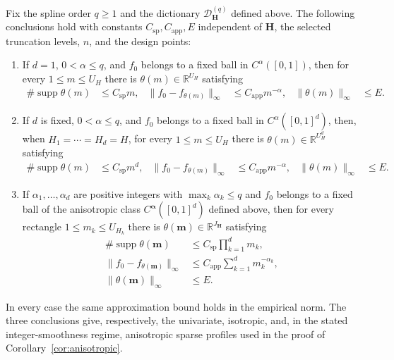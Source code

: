\begin{auxlemma}
\label{lem:bspline-profile}
Fix the spline order $q\geq1$ and the dictionary $\mathcal D_{\boldsymbol H}^{(q)}$ defined above. The following conclusions hold with constants $C_{\mathrm{sp}},C_{\mathrm{app}},E$ independent of $\boldsymbol H$, the selected truncation levels, $n$, and the design points:
\begin{enumerate}
\item If $d=1$, $0<\alpha\leq q$, and $f_0$ belongs to a fixed ball in
$C^\alpha([0,1])$, then for every $1\leq m\leq U_H$ there is $\theta(m)\in\mathbb R^{U_H}$ satisfying
\begin{align*}
\#\operatorname{supp}\theta(m)&\leq C_{\mathrm{sp}}m,
&\|f_0-f_{\theta(m)}\|_\infty&\leq C_{\mathrm{app}}m^{-\alpha},
&\|\theta(m)\|_\infty&\leq E.
\end{align*}
\item If $d$ is fixed, $0<\alpha\leq q$, and $f_0$ belongs to a fixed ball
in $C^\alpha([0,1]^d)$, then, when $H_1=\cdots=H_d=H$, for every $1\leq m\leq U_H$ there is $\theta(m)\in\mathbb R^{U_H^d}$ satisfying
\begin{align*}
\#\operatorname{supp}\theta(m)&\leq C_{\mathrm{sp}}m^d,
&\|f_0-f_{\theta(m)}\|_\infty&\leq C_{\mathrm{app}}m^{-\alpha},
&\|\theta(m)\|_\infty&\leq E.
\end{align*}
\item If $\alpha_1,\ldots,\alpha_d$ are positive integers with
$\max_k\alpha_k\leq q$ and $f_0$ belongs to a fixed ball of the anisotropic class $C^{\boldsymbol\alpha}([0,1]^d)$ defined above, then for every rectangle $1\leq m_k\leq U_{H_k}$ there is $\theta(\boldsymbol m)\in\mathbb R^{J_{\boldsymbol H}}$ satisfying
\begin{align*}
\#\operatorname{supp}\theta(\boldsymbol m)
&\leq C_{\mathrm{sp}}\prod_{k=1}^dm_k,\\
\|f_0-f_{\theta(\boldsymbol m)}\|_\infty
&\leq C_{\mathrm{app}}\sum_{k=1}^dm_k^{-\alpha_k},\\
\|\theta(\boldsymbol m)\|_\infty&\leq E.
\end{align*}
\end{enumerate}
In every case the same approximation bound holds in the empirical norm. The three conclusions give, respectively, the univariate, isotropic, and, in the stated integer-smoothness regime, anisotropic sparse profiles used in the proof of Corollary~\ref{cor:anisotropic}.
\end{auxlemma}

